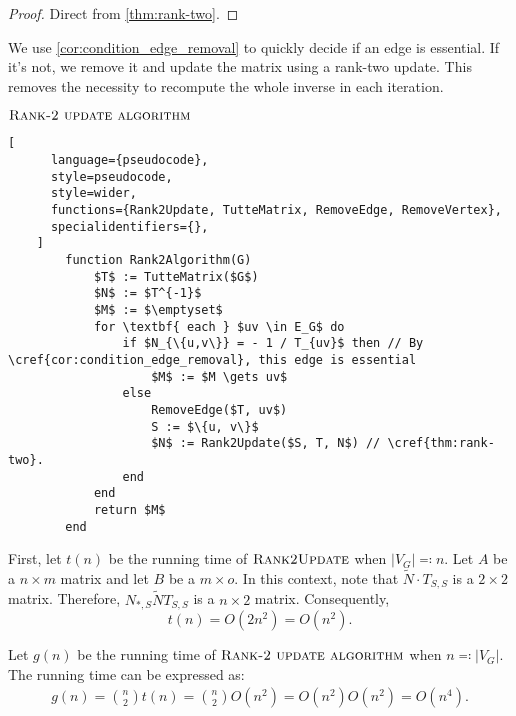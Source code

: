 \begin{proof}
    Direct from \cref{thm:rank-two}. 
\end{proof}

We use \cref{cor:condition_edge_removal} to quickly decide if an edge is essential. 
If it's not, we remove it and update the matrix using a rank-two update. 
This removes the necessity to recompute the whole inverse in each iteration.

\begin{programruledcaption}{\(\textsc{Rank-2 update algorithm}\)}
    \begin{lstlisting}[
      language={pseudocode},
      style=pseudocode,
      style=wider,
      functions={Rank2Update, TutteMatrix, RemoveEdge, RemoveVertex},
      specialidentifiers={},
    ]
        function Rank2Algorithm(G)
            $T$ := TutteMatrix($G$)
            $N$ := $T^{-1}$
            $M$ := $\emptyset$
            for \textbf{ each } $uv \in E_G$ do
                if $N_{\{u,v\}} = - 1 / T_{uv}$ then // By \cref{cor:condition_edge_removal}, this edge is essential
                    $M$ := $M \gets uv$
                else 
                    RemoveEdge($T, uv$)
                    S := $\{u, v\}$
                    $N$ := Rank2Update($S, T, N$) // \cref{thm:rank-two}.
                end
            end
            return $M$
        end
    \end{lstlisting}
\end{programruledcaption}

First, let \(t(n)\) be the running time of \(\textsc{Rank2Update}\) when \(|V_G| \eqcolon n\).
Let \(A\) be a \(n \times m\) matrix and let \(B\) be a \(m \times o\).
In this context, note that \(\tilde{N} \cdot T_{S, S}\) is a \(2 \times 2\) matrix.
Therefore, \(N_{*, S}\tilde{N}T_{S, S}\) is a \(n \times 2\) matrix.
Consequently,
\[
    t(n) = O(2n^2) = O(n^2).
\]

Let \(g(n)\) be the running time of \(\textsc{Rank-2 update algorithm}\) when \(n \eqcolon |V_G|\).
The running time can be expressed as:
\begin{align*}
    g(n) = \binom{n}{2} t(n) = \binom{n}{2} O(n^2) = O(n^2) O(n^2) = O(n^4).
\end{align*}

